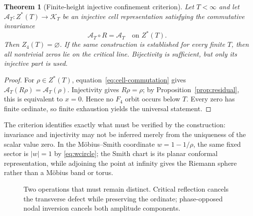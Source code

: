 \documentclass[11pt]{amsart}
\newtheorem{theorem}{Theorem}[section]
\theoremstyle{definition}
\theoremstyle{remark}
\begin{document}
\begin{theorem}[Finite-height injective confinement criterion]
\label{thm:injective-confinement}
Let $T<\infty$ and let
$\mathcal A_T:Z^*(T)\to\mathcal K_T$ be an injective cell representation satisfying the
commutative invariance
\begin{equation}\label{eq:cell-commutation}
 \mathcal A_T\circ R=\mathcal A_T
 \quad\text{on }Z^*(T).
\end{equation}
Then $Z_4(T)=\varnothing$.  If the same construction is established for every finite $T$,
then all nontrivial zeros lie on the critical line.  Bijectivity is sufficient, but only its
injective part is used.
\end{theorem}
\begin{proof}
For $\rho\in Z^*(T)$, equation~\eqref{eq:cell-commutation} gives
$\mathcal A_T(R\rho)=\mathcal A_T(\rho)$.  Injectivity gives $R\rho=\rho$; by
Proposition~\ref{prop:residual}, this is equivalent to $x=0$.  Hence no $F_4$ orbit occurs
below $T$.  Every zero has finite ordinate, so finite exhaustion yields the universal statement.
\end{proof}

The criterion identifies exactly what must be verified by the construction: invariance and
injectivity may not be inferred merely from the uniqueness of the scalar value zero.  In the
M\"obius--Smith coordinate $w=1-1/\rho$, the same fixed sector is $|w|=1$ by
\eqref{eq:wcircle}; the Smith chart is its planar conformal representation, while adjoining
the point at infinity gives the Riemann sphere rather than a M\"obius band or torus.

\begin{figure}[H]
\centering
{}
\caption{Two operations that must remain distinct.  Critical reflection cancels the transverse
defect while preserving the ordinate; phase-opposed nodal inversion cancels both amplitude
components.}
\label{fig:matrix-compression}
\end{figure}
\end{document}
